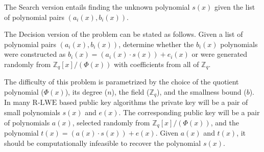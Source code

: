 The Search version entails finding the unknown polynomial $s(x)$ given the list of polynomial pairs $(a_{i}(x),b_{i}(x))$.

The Decision version of the problem can be stated as follows. Given a list of polynomial pairs $(a_{i}(x),b_{i}(x))$, determine whether the $b_{i}(x)$ polynomials were constructed as $b_{i}(x)=(a_{i}(x)\cdot s(x))+e_{i}(x)$ or were generated randomly from $\mathbb{Z} _{q}[x]/(\Phi (x))$ with coefficients from all of $\mathbb{Z}_q$.

The difficulty of this problem is parametrized by the choice of the quotient polynomial ($\Phi (x)$), its degree ($n$), the field ($\mathbb{Z}_q$), and the smallness bound ($b$). In many $\mathrm{R\text{-}LWE}$ based public key algorithms the private key will be a pair of small polynomials $s(x)$ and $e(x)$. The corresponding public key will be a pair of polynomials $a(x)$, selected randomly from $\mathbb{Z} _{q}[x]/(\Phi (x))$, and the polynomial $t(x)=(a(x)\cdot s(x))+e(x)$. Given $a(x)$ and $t(x)$, it should be computationally infeasible to recover the polynomial $s(x)$.




